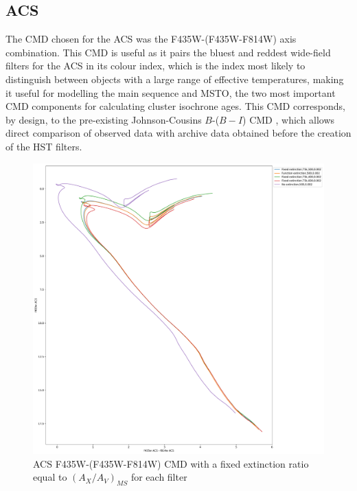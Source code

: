 \documentclass[12pt, a4paper]{report}
\begin{document}
\subsection{ACS} \label{ACS_isoc}
The CMD chosen for the ACS was the F435W-(F435W-F814W) axis combination. This CMD is useful as it pairs the bluest and reddest wide-field filters for the ACS in its colour index, which is the index most likely to distinguish between objects with a large range of effective temperatures, making it useful for modelling the main sequence and MSTO, the two most important CMD components for calculating cluster isochrone ages. This CMD corresponds, by design, to the pre-existing Johnson-Cousins $B$-($B-I$) CMD \citep{2005PASP..117.1049S}, which allows direct comparison of observed data with archive data obtained before the creation of the HST filters.

\begin{figure}[h]
\begin{center}
\includegraphics[scale=0.25]{../basti_isochrones_10_13Gyr/Extinction_T5k_FeH0fix_func_f435wACS_f435wACSmf814wACS_500_400_600_Myr_FeH_0p002_ref_noext_Av_1p0.pdf}
\caption{ACS F435W-(F435W-F814W) CMD with a fixed extinction ratio equal to $(A_{X}/A_{V})_{MS}$ for each filter}
\label{acs_isoc_T5k}
\end{center}
\end{figure}
\end{document}
